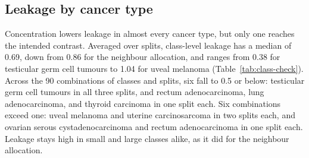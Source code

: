 \subsection{Leakage by cancer type}
\label{sec:check-classes}
Concentration lowers leakage in almost every cancer type, but only one reaches the intended contrast. Averaged over splits, class-level leakage has a median of 0.69, down from 0.86 for the neighbour allocation, and ranges from 0.38 for testicular germ cell tumours to 1.04 for uveal melanoma (Table~\ref{tab:class-check}). Across the 90 combinations of classes and splits, six fall to 0.5 or below: testicular germ cell tumours in all three splits, and rectum adenocarcinoma, lung adenocarcinoma, and thyroid carcinoma in one split each. Six combinations exceed one: uveal melanoma and uterine carcinosarcoma in two splits each, and ovarian serous cystadenocarcinoma and rectum adenocarcinoma in one split each. Leakage stays high in small and large classes alike, as it did for the neighbour allocation.

